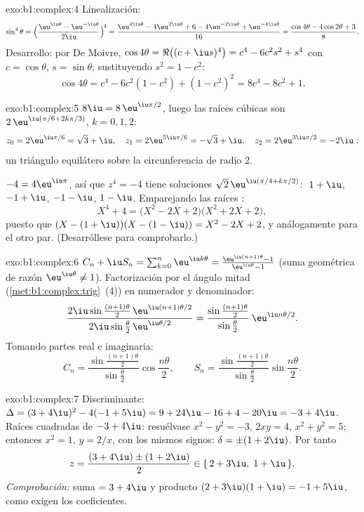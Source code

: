 \begin{solution}{exo:b1:complex:4}
Linealización:
\[
\sin^4\theta
= \Bigl(\frac{\eu^{\iu\theta} - \eu^{-\iu\theta}}{2\iu}\Bigr)^{\!4}
= \frac{\eu^{4\iu\theta} - 4\eu^{2\iu\theta} + 6 - 4\eu^{-2\iu\theta}
+ \eu^{-4\iu\theta}}{16}
= \frac{\cos 4\theta - 4\cos 2\theta + 3}{8}.
\]
Desarrollo: por De Moivre, $\cos 4\theta = \Re\bigl((c +
\iu s)^4\bigr) = c^4 - 6c^2 s^2 + s^4$ con $c = \cos\theta$,
$s = \sin\theta$; sustituyendo $s^2 = 1 - c^2$:
\[
\cos 4\theta = c^4 - 6c^2(1 - c^2) + (1 - c^2)^2
= 8c^4 - 8c^2 + 1 .
\]
\end{solution}

\begin{solution}{exo:b1:complex:5}
$8\iu = 8\,\eu^{\iu\pi/2}$, luego las raíces cúbicas son
$2\,\eu^{\iu(\pi/6 + 2k\pi/3)}$, $k = 0, 1, 2$:
\[
z_0 = 2\eu^{\iu\pi/6} = \sqrt 3 + \iu,\quad
z_1 = 2\eu^{5\iu\pi/6} = -\sqrt 3 + \iu,\quad
z_2 = 2\eu^{3\iu\pi/2} = -2\iu :
\]
un triángulo equilátero sobre la circunferencia de radio $2$.

$-4 = 4\eu^{\iu\pi}$, así que $z^4 = -4$ tiene soluciones $\sqrt 2\,
\eu^{\iu(\pi/4 + k\pi/2)}$: $\;1 + \iu$, $-1 + \iu$, $-1 - \iu$,
$1 - \iu$. Emparejando las raíces :
\[
X^4 + 4 = \bigl(X^2 - 2X + 2\bigr)\bigl(X^2 + 2X + 2\bigr),
\]
puesto que $(X - (1+\iu))(X - (1-\iu)) = X^2 - 2X + 2$, y análogamente
para el otro par. (Desarróllese para comprobarlo.)
\end{solution}

\begin{solution}{exo:b1:complex:6}
$C_n + \iu S_n = \sum_{k=0}^{n} \eu^{\iu k\theta} =
\frac{\eu^{\iu(n+1)\theta} - 1}{\eu^{\iu\theta} - 1}$ (suma geométrica
de razón $\eu^{\iu\theta} \neq 1$). Factorización por el ángulo mitad
(\cref{met:b1:complex:trig}~(4)) en numerador y denominador:
\[
\frac{2\iu\sin\frac{(n+1)\theta}{2}\, \eu^{\iu(n+1)\theta/2}}
{2\iu\sin\frac{\theta}{2}\, \eu^{\iu\theta/2}}
= \frac{\sin\frac{(n+1)\theta}{2}}{\sin\frac{\theta}{2}}\,
\eu^{\iu n\theta/2}.
\]
Tomando partes real e imaginaria:
\[
C_n = \frac{\sin\frac{(n+1)\theta}{2}}{\sin\frac{\theta}{2}}
\cos\frac{n\theta}{2},
\qquad
S_n = \frac{\sin\frac{(n+1)\theta}{2}}{\sin\frac{\theta}{2}}
\sin\frac{n\theta}{2}.
\]
\end{solution}

\begin{solution}{exo:b1:complex:7}
Discriminante: $\Delta = (3 + 4\iu)^2 - 4(-1 + 5\iu) = 9 + 24\iu - 16 +
4 - 20\iu = -3 + 4\iu$. Raíces cuadradas de $-3 + 4\iu$: resuélvase
$x^2 - y^2 = -3$, $2xy = 4$, $x^2 + y^2 = 5$; entonces $x^2 = 1$,
$y = 2/x$, con los mismos signos: $\delta = \pm(1 + 2\iu)$. Por tanto
\[
z = \frac{(3 + 4\iu) \pm (1 + 2\iu)}{2}
\in \{\, 2 + 3\iu,\; 1 + \iu \,\}.
\]
\emph{Comprobación:} suma $= 3 + 4\iu$ y producto
$(2+3\iu)(1+\iu) = -1 + 5\iu$, como exigen los coeficientes.
\end{solution}

